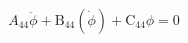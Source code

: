 \begin{equation} \label{eq:roll_decay_equation_general_himeno}
A_{44} \ddot{\phi} + \operatorname{B_{44}}\left(\dot{\phi}\right) + \operatorname{C_{44}}\phi = 0
\end{equation}
